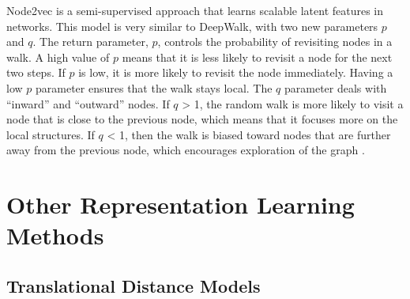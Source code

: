 Node2vec is a semi-supervised approach that learns scalable latent features in networks.
This model is very similar to DeepWalk, with two new parameters $p$ and $q$.
The return parameter, $p$, controls the probability of revisiting nodes in a walk.
A high value of $p$ means that it is less likely to revisit a node for the next two steps.
If $p$ is low, it is more likely to revisit the node immediately.
Having a low $p$ parameter ensures that the walk stays local.
The $q$ parameter deals with “inward” and “outward” nodes.
If $q$ > 1, the random walk is more likely to visit a node that is close to the previous node, which means that it focuses more on the local structures.
If $q$ < 1, then the walk is biased toward nodes that are further away from the previous node, which encourages exploration of the graph \cite{grover_node2vec:_2016}.

\begin{figure}[h!]
\end{figure}
\section{Other Representation Learning Methods}

\subsection{Translational Distance Models}

